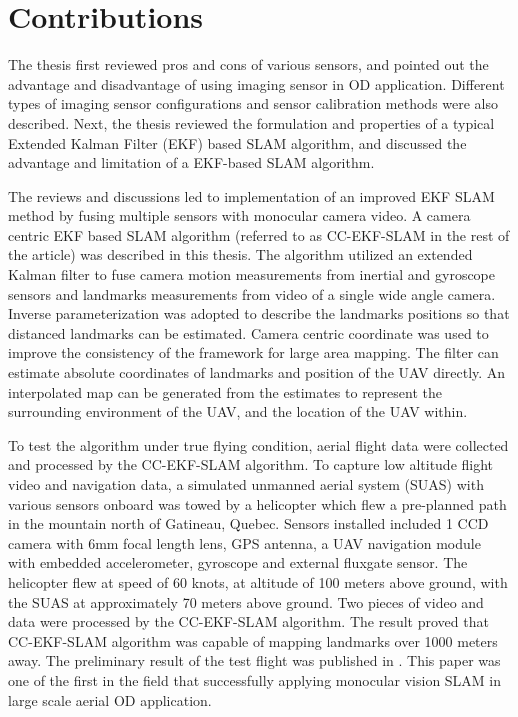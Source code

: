 \section{Contributions}\label{section:Contribution}
The thesis first reviewed pros and cons of various sensors, and
pointed out the advantage and disadvantage of using imaging sensor in
OD application. Different types of imaging sensor configurations and
sensor calibration methods were also described. Next, the thesis
reviewed the formulation and properties of a typical Extended Kalman
Filter (EKF) based SLAM algorithm, and discussed the advantage and
limitation of a EKF-based SLAM algorithm.

The reviews and discussions led to implementation of an improved EKF
SLAM method by fusing multiple sensors with monocular camera video.
A camera centric EKF based SLAM algorithm (referred to as CC-EKF-SLAM
in the rest of the article) was described in this thesis. The
algorithm utilized an extended Kalman filter to fuse camera motion
measurements from inertial and gyroscope sensors and landmarks
measurements from video of a single wide angle camera. Inverse
parameterization was adopted to describe the landmarks positions so
that distanced landmarks can be estimated. Camera centric coordinate
was used to improve the consistency of the framework for large area
mapping. The filter can estimate absolute coordinates of landmarks and
position of the UAV directly. An interpolated map can be generated
from the estimates to represent the surrounding environment of the
UAV, and the location of the UAV within.

To test the algorithm under true flying condition, aerial flight data
were collected and processed by the CC-EKF-SLAM algorithm. To capture
low altitude flight video and navigation data, a simulated unmanned
aerial system (SUAS) with various sensors onboard was towed by a
helicopter which flew a pre-planned path in the mountain north of
Gatineau, Quebec. Sensors installed included 1 CCD camera with 6mm
focal length lens, GPS antenna, a UAV navigation module with embedded
accelerometer, gyroscope and external fluxgate sensor. The helicopter
flew at speed of 60 knots, at altitude of 100 meters above ground,
with the SUAS at approximately 70 meters above ground. Two pieces of
video and data were processed by the CC-EKF-SLAM algorithm. The result
proved that CC-EKF-SLAM algorithm was capable of mapping landmarks
over 1000 meters away. The preliminary result of the test flight was
published in \cite{zhang_obstacle_2012}. This paper was one of the
first in the field that successfully applying monocular vision SLAM in
large scale aerial OD application.

